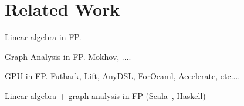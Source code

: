 \section{Related Work}

Linear algebra in FP. 

Graph Analysis in FP. Mokhov, ....

GPU in FP. Futhark, Lift, AnyDSL, ForOcaml, Accelerate, etc....

Linear algebra + graph analysis in FP (Scala~\cite{7965105}, Haskell)